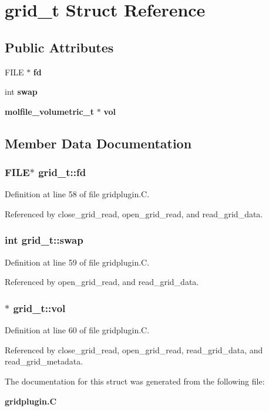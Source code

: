 \section{grid\_\-t  Struct Reference}
\label{structgrid__t}
\subsection*{Public Attributes}
\begin{CompactItemize}
\item 
FILE $\ast$ {\bf fd}
\item 
int {\bf swap}
\item 
{\bf molfile\_\-volumetric\_\-t} $\ast$ {\bf vol}
\end{CompactItemize}


\subsection{Member Data Documentation}
\subsubsection{\setlength{\rightskip}{0pt plus 5cm}FILE$\ast$ grid\_\-t::fd}\label{structgrid__t_m0}




Definition at line 58 of file gridplugin.C.

Referenced by close\_\-grid\_\-read, open\_\-grid\_\-read, and read\_\-grid\_\-data.
\subsubsection{\setlength{\rightskip}{0pt plus 5cm}int grid\_\-t::swap}\label{structgrid__t_m1}




Definition at line 59 of file gridplugin.C.

Referenced by open\_\-grid\_\-read, and read\_\-grid\_\-data.
\subsubsection{$\ast$ grid\_\-t::vol}\label{structgrid__t_m2}




Definition at line 60 of file gridplugin.C.

Referenced by close\_\-grid\_\-read, open\_\-grid\_\-read, read\_\-grid\_\-data, and read\_\-grid\_\-metadata.

The documentation for this struct was generated from the following file:\begin{CompactItemize}
\item 
{\bf gridplugin.C}\end{CompactItemize}
